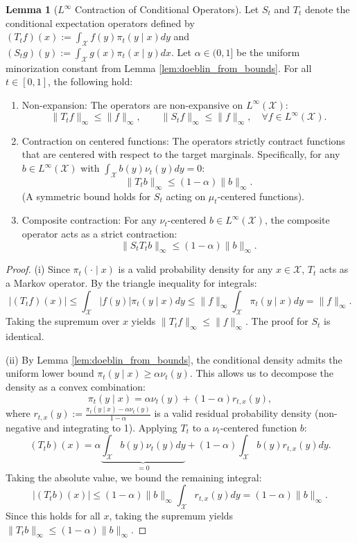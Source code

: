 \documentclass[11pt]{article}
\theoremstyle{definition}
\newtheorem{lemma}[theorem]{Lemma}
\numberwithin{equation}{section}%
\begin{document}
{\begin{lemma}[$L^\infty$ Contraction of Conditional Operators]
\label{lem:Doeblin_centered_Linfty}
Let $S_t$ and $T_t$ denote the conditional expectation operators defined by $(T_t f)(x) := \int_{\mathcal{X}} f(y) \pi_t(y \mid x) dy$ and $(S_t g)(y) := \int_{\mathcal{X}} g(x) \pi_t(x \mid y) dx$. Let $\alpha \in (0,1]$ be the uniform minorization constant from Lemma \ref{lem:doeblin_from_bounds}. For all $t \in [0,1]$, the following hold:
\begin{enumerate}[label=(\roman*)]
    \item Non-expansion: The operators are non-expansive on $L^\infty(\mathcal{X})$:
    \[
    \|T_t f\|_\infty \le \|f\|_\infty, \qquad \|S_t f\|_\infty \le \|f\|_\infty, \quad \forall f \in L^\infty(\mathcal{X}).
    \]
    \item Contraction on centered functions: The operators strictly contract functions that are centered with respect to the target marginals. Specifically, for any $b \in L^\infty(\mathcal{X})$ with $\int_{\mathcal{X}} b(y) \nu_t(y) dy = 0$:
    \[
    \|T_t b\|_\infty \le (1-\alpha)\|b\|_\infty.
    \]
    (A symmetric bound holds for $S_t$ acting on $\mu_t$-centered functions).
    \item Composite contraction: For any $\nu_t$-centered $b \in L^\infty(\mathcal{X})$, the composite operator acts as a strict contraction:
    \[
    \|S_t T_t b\|_\infty \le (1-\alpha)\|b\|_\infty.
    \]
\end{enumerate}
\end{lemma}

\begin{proof}
(i) Since $\pi_t(\cdot \mid x)$ is a valid probability density for any $x \in \mathcal{X}$, $T_t$ acts as a Markov operator. By the triangle inequality for integrals:
\[
|(T_t f)(x)| \le \int_{\mathcal{X}} |f(y)| \pi_t(y \mid x) dy \le \|f\|_\infty \int_{\mathcal{X}} \pi_t(y \mid x) dy = \|f\|_\infty.
\]
Taking the supremum over $x$ yields $\|T_t f\|_\infty \le \|f\|_\infty$. The proof for $S_t$ is identical.

(ii) By Lemma \ref{lem:doeblin_from_bounds}, the conditional density admits the uniform lower bound $\pi_t(y \mid x) \ge \alpha \nu_t(y)$. This allows us to decompose the density as a convex combination:
\[
\pi_t(y \mid x) = \alpha \nu_t(y) + (1-\alpha) r_{t,x}(y),
\]
where $r_{t,x}(y) := \frac{\pi_t(y \mid x) - \alpha \nu_t(y)}{1-\alpha}$ is a valid residual probability density (non-negative and integrating to 1). Applying $T_t$ to a $\nu_t$-centered function $b$:
\[
(T_t b)(x) = \alpha \underbrace{\int_{\mathcal{X}} b(y) \nu_t(y) dy}_{= 0} + (1-\alpha) \int_{\mathcal{X}} b(y) r_{t,x}(y) dy.
\]
Taking the absolute value, we bound the remaining integral:
\[
|(T_t b)(x)| \le (1-\alpha)\|b\|_\infty \int_{\mathcal{X}} r_{t,x}(y) dy = (1-\alpha)\|b\|_\infty.
\]
Since this holds for all $x$, taking the supremum yields $\|T_t b\|_\infty \le (1-\alpha)\|b\|_\infty$.


\end{proof}}
\end{document}
